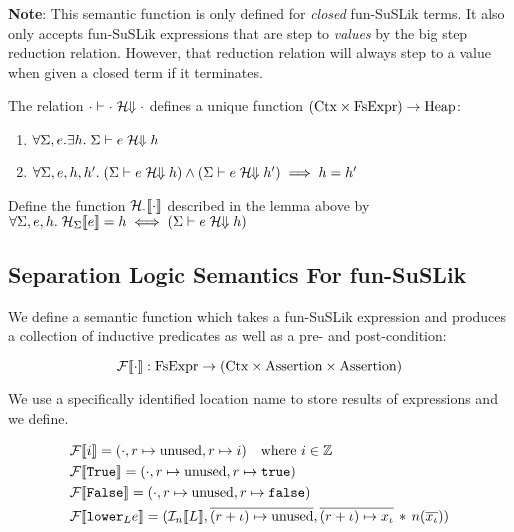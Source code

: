 \documentclass[10pt]{article}
\begin{document}
\noindent
\textbf{Note}: This semantic function is only defined for \textit{closed} fun-SuSLik terms. It also only
accepts fun-SuSLik expressions that are step to \textit{values} by the big step reduction relation. However,
that reduction relation will always step to a value when given a closed term if it terminates.

\begin{lemma}
  The relation $\cdot \vdash \cdot \;\mathcal{H}\!\!\Downarrow \cdot$ defines a unique function $(\textnormal{Ctx} \times \textnormal{FsExpr}) \rightarrow \textnormal{Heap}$:
  \begin{enumerate}
    \item $\forall \Sigma, e. \exists h.\; \Sigma \vdash e \;\mathcal{H}\!\!\Downarrow h$
    \item $\forall \Sigma, e, h, h'.\; (\Sigma \vdash e \;\mathcal{H}\!\!\Downarrow h) \land (\Sigma \vdash e \;\mathcal{H}\!\!\Downarrow h') \implies h = h'$
  \end{enumerate}
\end{lemma}

\begin{definition}
  Define the function $\mathcal{H}_{\cdot}\llbracket\cdot\rrbracket$ described in the lemma above by\\
  $\forall \Sigma, e, h.\; \mathcal{H}_{\Sigma}\llbracket e\rrbracket = h \iff (\Sigma \vdash e \;\mathcal{H}\!\!\Downarrow h)$
\end{definition}

\subsection{Separation Logic Semantics For fun-SuSLik}
We define a semantic function which takes a fun-SuSLik expression and produces a collection
of inductive predicates as well as a pre- and post-condition:

\begin{equation*}
  \mathcal{F}\llbracket\cdot\rrbracket : \textnormal{FsExpr} \rightarrow (\textnormal{Ctx} \times \textnormal{Assertion} \times \textnormal{Assertion})
\end{equation*}

\noindent
We use a specifically identified location name  to store results of expressions and we define.

\begin{align*}
  &\mathcal{F}\llbracket i\rrbracket = (\cdot, r \mapsto \textnormal{unused}, r \mapsto i)~~~\textnormal{where $i \in \mathbb{Z}$}\\
  &\mathcal{F}\llbracket\texttt{True}\rrbracket = (\cdot, r \mapsto \textnormal{unused}, r \mapsto \texttt{true})\\
  &\mathcal{F}\llbracket\texttt{False}\rrbracket = (\cdot, r \mapsto \textnormal{unused}, r \mapsto \texttt{false})\\
  &\mathcal{F}\llbracket\textnormal{\texttt{lower}}_{L} e\rrbracket = (\mathcal{I}_{n}\llbracket L\rrbracket, \overline{(r+\iota) \mapsto \textnormal{unused}}, \overline{(r+\iota) \mapsto x_{\iota}} \,*\, n(\overline{x_\iota}))\\
\end{align*}
\end{document}
